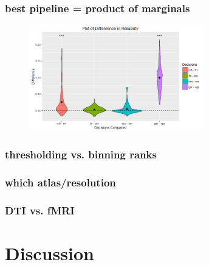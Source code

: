 \documentclass{article}
\begin{document}
\subsubsection{best pipeline = product of marginals}


\begin{figure}[t!]
\includegraphics[width=3.0in]{../Figs/Differ_violin_mean.png}
\caption{}
\label{fig:64}
\end{figure}



\subsubsection{thresholding vs. binning ranks}

\subsubsection{which atlas/resolution}


\subsubsection{DTI vs. fMRI}










\section{Discussion}






% 
% 
% 
% 
% 
% 
% 
% 



\appendix






\newpage
\small{


}
\end{document}
